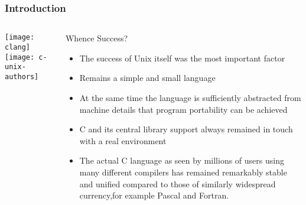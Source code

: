 \begin{frame}[plain]
	\frametitle{Introduction}
	
	
	
	\begin{columns}
		
		\begin{column}{.3\textwidth}
			
			\texttt{[image: clang]}
			\texttt{[image: c-unix-authors]}
		\end{column}
		
		\begin{column}{.7\textwidth}
			
			\Large
			Whence Success? 
			
			\normalsize
			\begin{itemize}
				\item  The success of Unix itself was the most important factor
				\item  Remains a simple and small language
				\item  At the same time the language is sufficiently abstracted from machine details that program portability can be achieved
				\item  C and its central library support always remained in touch with a real environment
				\item The actual C language as seen by millions of users using many different compilers has remained remarkably stable and unified compared to those of similarly widespread currency,for example Pascal and Fortran.
			\end{itemize}
			
		\end{column}
		
		
	\end{columns}
	
	
\end{frame}


